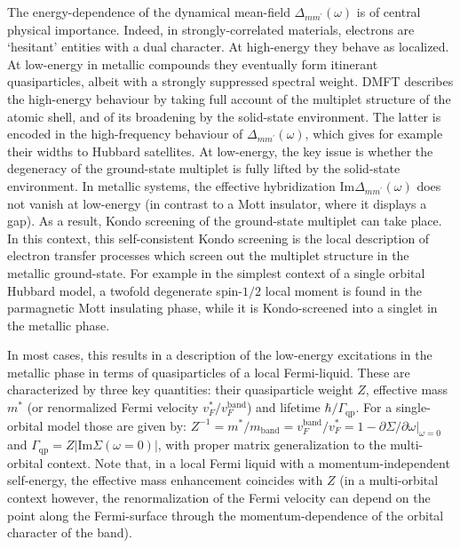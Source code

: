 \documentclass[]{ar2e-changed}%
\def\mp{m^\prime}
\begin{document}
The energy-dependence of the dynamical mean-field $\Delta_{m\mp}(\omega)$ is of central physical 
importance. 
%
Indeed, in strongly-correlated materials, electrons are `hesitant' entities with a dual character. 
%
At high-energy they behave as localized. At low-energy in metallic compounds they 
eventually form itinerant quasiparticles, albeit with a strongly suppressed spectral weight. 
%
DMFT describes the high-energy behaviour by taking full account of the multiplet structure of the atomic shell, and of its broadening 
by the solid-state environment. The latter is encoded in the high-frequency behaviour of $\Delta_{m\mp}(\omega)$, which 
gives for example their widths to Hubbard satellites. 
%
At low-energy, the key issue is whether the degeneracy of the ground-state multiplet is fully lifted by 
the solid-state environment. 
%
In metallic systems, the effective hybridization $\mathrm{Im}\Delta_{m\mp}(\omega)$ does not vanish at low-energy 
(in contrast to a Mott insulator, where it displays a gap). 
%
As a result, Kondo screening of the ground-state multiplet can take place. 
%
In this context, this self-consistent Kondo screening is the local description of electron transfer processes which screen out the multiplet 
structure in the metallic ground-state. 
%
For example in the simplest context of a single orbital Hubbard model, a twofold degenerate spin-$1/2$ 
local moment is found in the parmagnetic Mott insulating phase, while it is Kondo-screened into a singlet 
in the metallic phase. 
%

In most cases, this results in a description of the low-energy
excitations in the metallic phase in terms of quasiparticles of a
local Fermi-liquid. These are characterized by three key quantities:
their quasiparticle weight $Z$, effective mass $m^*$ (or renormalized
Fermi velocity $v_F^*/v_F^{\mathrm{band}}$) and lifetime
$\hbar/\Gamma_{\mathrm{qp}}$.
%
For a single-orbital model those are given by: 
$Z^{-1}=m^*/m_{\mathrm{band}}=v_F^{\mathrm{band}}/v_F^*=1-\partial\Sigma/\partial\omega|_{\omega=0}$ and 
$\Gamma_{\mathrm{qp}}=Z|\mathrm{Im}\Sigma(\omega=0)|$, with proper matrix generalization to the 
multi-orbital context. 
%
Note that, in a local Fermi liquid with a momentum-independent self-energy, the effective mass  enhancement coincides with $Z$ (in a multi-orbital context however, the 
renormalization of the Fermi velocity can depend on the point along the Fermi-surface through the momentum-dependence of 
the orbital character of the band).  
\end{document}
